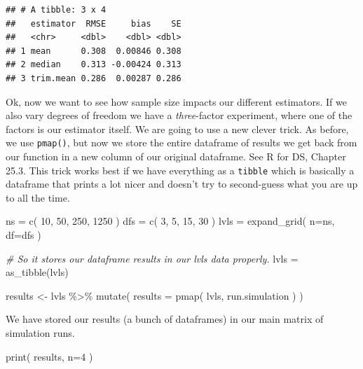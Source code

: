 \documentclass[
]{book}
\newenvironment{Shaded}{\begin{snugshade}}{\end{snugshade}}
\newcommand{\AttributeTok}[1]{\textcolor[rgb]{0.77,0.63,0.00}{#1}}
\newcommand{\CommentTok}[1]{\textcolor[rgb]{0.56,0.35,0.01}{\textit{#1}}}
\newcommand{\DecValTok}[1]{\textcolor[rgb]{0.00,0.00,0.81}{#1}}
\newcommand{\FunctionTok}[1]{\textcolor[rgb]{0.00,0.00,0.00}{#1}}
\newcommand{\NormalTok}[1]{#1}
\newcommand{\OtherTok}[1]{\textcolor[rgb]{0.56,0.35,0.01}{#1}}
\newcommand{\SpecialCharTok}[1]{\textcolor[rgb]{0.00,0.00,0.00}{#1}}
\begin{document}
\begin{verbatim}
## # A tibble: 3 x 4
##   estimator  RMSE     bias    SE
##   <chr>     <dbl>    <dbl> <dbl>
## 1 mean      0.308  0.00846 0.308
## 2 median    0.313 -0.00424 0.313
## 3 trim.mean 0.286  0.00287 0.286
\end{verbatim}

Ok, now we want to see how sample size impacts our different estimators. If
we also vary degrees of freedom we have a \emph{three}-factor experiment, where
one of the factors is our estimator itself. We are going to use a new clever
trick. As before, we use \texttt{pmap()}, but now we store the entire dataframe of
results we get back from our function in a new column of our original
dataframe. See R for DS, Chapter 25.3. This trick works best if we have
everything as a \texttt{tibble} which is basically a dataframe that prints a lot
nicer and doesn't try to second-guess what you are up to all the time.

\begin{Shaded}
\begin{Highlighting}[]
\NormalTok{ns }\OtherTok{=} \FunctionTok{c}\NormalTok{( }\DecValTok{10}\NormalTok{, }\DecValTok{50}\NormalTok{, }\DecValTok{250}\NormalTok{, }\DecValTok{1250}\NormalTok{ )}
\NormalTok{dfs }\OtherTok{=} \FunctionTok{c}\NormalTok{( }\DecValTok{3}\NormalTok{, }\DecValTok{5}\NormalTok{, }\DecValTok{15}\NormalTok{, }\DecValTok{30}\NormalTok{ )}
\NormalTok{lvls }\OtherTok{=} \FunctionTok{expand\_grid}\NormalTok{( }\AttributeTok{n=}\NormalTok{ns, }\AttributeTok{df=}\NormalTok{dfs )}

\CommentTok{\# So it stores our dataframe results in our lvls data properly.}
\NormalTok{lvls }\OtherTok{=} \FunctionTok{as\_tibble}\NormalTok{(lvls)}

\NormalTok{results }\OtherTok{\textless{}{-}}\NormalTok{ lvls }\SpecialCharTok{\%\textgreater{}\%} \FunctionTok{mutate}\NormalTok{( }\AttributeTok{results =} \FunctionTok{pmap}\NormalTok{( lvls, run.simulation ) )}
\end{Highlighting}
\end{Shaded}

We have stored our results (a bunch of dataframes) in our main matrix of
simulation runs.

\begin{Shaded}
\begin{Highlighting}[]
\FunctionTok{print}\NormalTok{( results, }\AttributeTok{n=}\DecValTok{4}\NormalTok{ )}
\end{Highlighting}
\end{Shaded}
\end{document}
